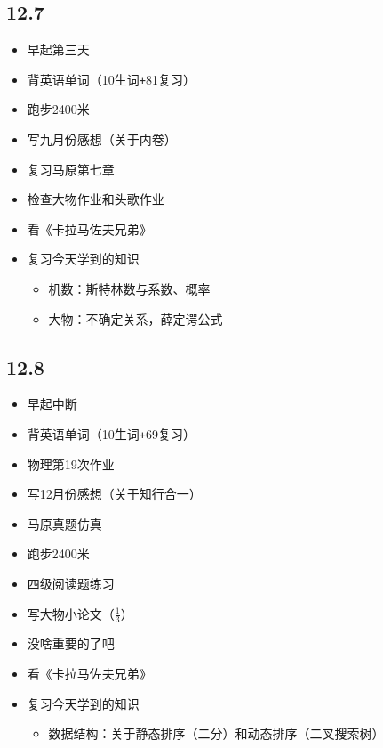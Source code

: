 \documentclass[UTF8]{ctexart}
\begin{document}
\subsection*{12.7}
\begin{itemize}
    \item 早起第三天
    \item 背英语单词（10生词\verb|+|81复习）
    \item 跑步2400米
    \item 写九月份感想（关于内卷）
    \item 复习马原第七章
    \item 检查大物作业和头歌作业
    \item 看《卡拉马佐夫兄弟》
    \item 复习今天学到的知识
          \begin{itemize}
              \item 机数：斯特林数与系数、概率
              \item 大物：不确定关系，薛定谔公式
          \end{itemize}
\end{itemize}
\subsection*{12.8}
\begin{itemize}
    \item 早起中断
    \item 背英语单词（10生词\verb|+|69复习）
    \item 物理第19次作业
    \item 写12月份感想（关于知行合一）
    \item 马原真题仿真
    \item 跑步2400米
    \item 四级阅读题练习
    \item 写大物小论文（$\frac{1}{3}$）
    \item 没啥重要的了吧
    \item 看《卡拉马佐夫兄弟》
    \item 复习今天学到的知识
          \begin{itemize}
              \item 数据结构：关于静态排序（二分）和动态排序（二叉搜索树）
          \end{itemize}
\end{itemize}
\end{document}
